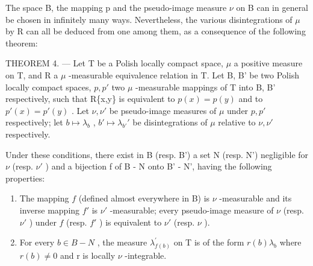 The space B, the mapping p and the pseudo-image measure \(\nu\) on B can in general be chosen in infinitely many ways. Nevertheless, the various disintegrations of \(\mu\) by R can all be deduced from one among them, as a consequence of the following theorem:

THEOREM 4. --- Let T be a Polish locally compact space, \(\mu\) a positive measure on T, and R a \(\mu\) -measurable equivalence relation in T. Let B, B' be two Polish locally compact spaces, \(p, p'\) two \(\mu\) -measurable mappings of T into B, B' respectively, such that R\{x,y\} is equivalent to \(p(x) = p(y)\) and to \(p'(x) = p'(y)\) . Let \(\nu, \nu'\) be pseudo-image measures of \(\mu\) under \(p, p'\) respectively; let \(b \mapsto \lambda_b\) , \(b' \mapsto \lambda_{b'}'\) be disintegrations of \(\mu\) relative to \(\nu, \nu'\) respectively.

Under these conditions, there exist in B (resp. B') a set N (resp. N') negligible for \(\nu\) (resp. \(\nu'\) ) and a bijection f of B - N onto B' - N', having the following properties:

\begin{enumerate}
\def\labelenumi{\alph{enumi})}
\item
  The mapping \(f\) (defined almost everywhere in B) is \(\nu\) -measurable and its inverse mapping \(f'\) is \(\nu'\) -measurable; every pseudo-image measure of \(\nu\) (resp. \(\nu'\) ) under \(f\) (resp. \(f'\) ) is equivalent to \(\nu'\) (resp. \(\nu\) ).
\item
  For every \(b \in B - N\) , the measure \(\lambda_{f(b)}^{\prime}\) on T is of the form \(r(b)\lambda_{b}\) where \(r(b) \neq 0\) and r is locally \(\nu\) -integrable.
\end{enumerate}

